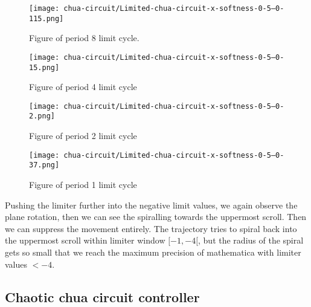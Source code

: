 \documentclass[main]{subfiles}
\begin{document}
\begin{figure}[H]
\centering
\texttt{[image: chua-circuit/Limited-chua-circuit-x-softness-0-5--0-115.png]}
\caption[Figure of period 8 limit cycle]{Figure of period 8 limit cycle.}
\label{figure:x-0.5-8-limit-cycle-upperscroll-trajectory}
\end{figure}

\begin{figure}[H]
\centering
\texttt{[image: chua-circuit/Limited-chua-circuit-x-softness-0-5--0-15.png]}
\caption[Figure of period 4 limit cycle]{Figure of period 4 limit cycle}
\label{figure:x-0.5-4-limit-cycle-upperscroll-trajectory}
\end{figure}

\begin{figure}[H]
\centering
\texttt{[image: chua-circuit/Limited-chua-circuit-x-softness-0-5--0-2.png]}
\caption[Figure of period 3 limit cycle]{Figure of period 2 limit cycle}
\label{figure:x-0.5-2-limit-cycle-upperscroll-trajectory}
\end{figure}

\begin{figure}[H]
\centering
\texttt{[image: chua-circuit/Limited-chua-circuit-x-softness-0-5--0-37.png]}
\caption[Figure of period 1 limit cycle]{Figure of period 1 limit cycle}
\label{figure:x-0.5-1-limit-cycle-upperscroll-trajectory}
\end{figure}

Pushing the limiter further into the negative limit values, we again observe the plane rotation, then we can see the spiralling towards the uppermost scroll. Then we can suppress the movement entirely. The trajectory tries to spiral back into the uppermost scroll within limiter window \([-1,-4[\), but the radius of the spiral gets so small that we reach the maximum precision of mathematica with limiter values \(<-4\).

\subsection{Chaotic chua circuit controller}
\end{document}
